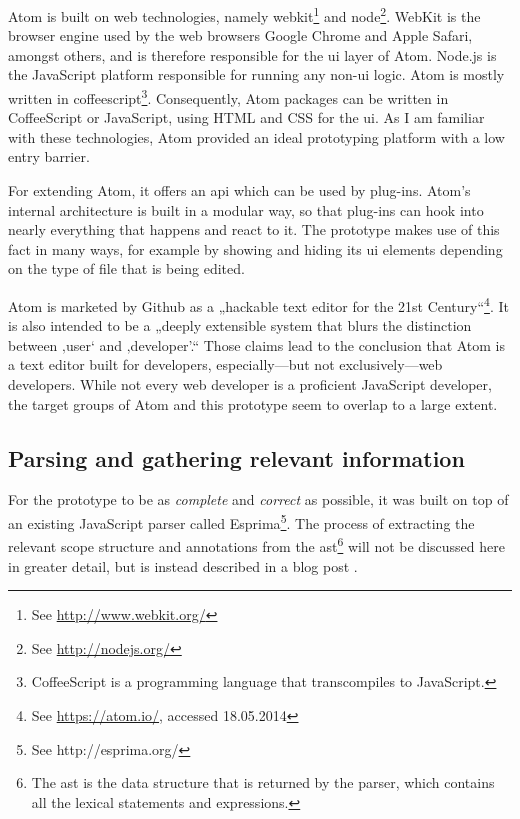 Atom is built on web technologies, namely
\gls{webkit}\footnote{See \url{http://www.webkit.org/}} and
\gls{node}\footnote{See \url{http://nodejs.org/}}. WebKit is the browser
engine used by the web browsers Google Chrome and Apple Safari, amongst
others, and is therefore responsible for the \acl{ui} layer of Atom.
Node.js is the JavaScript platform responsible for running any
non-\ac{ui} logic. Atom is mostly written in
\gls{coffeescript}\footnote{CoffeeScript is a programming language that transcompiles to JavaScript.}.
Consequently, Atom packages can be written in CoffeeScript or
JavaScript, using HTML and CSS for the \ac{ui}. As I am familiar with
these technologies, Atom provided an ideal prototyping platform with a
low entry barrier.

For extending Atom, it offers an \ac{api} which can be used by plug-ins.
Atom’s internal architecture is built in a modular way, so that plug-ins
can hook into nearly everything that happens and react to it. The
prototype makes use of this fact in many ways, for example by showing
and hiding its \ac{ui} elements depending on the type of file that is
being edited.

Atom is marketed by Github as a „hackable text editor for the 21st
Century“\footnote{See \url{https://atom.io/}, accessed 18.05.2014}. It
is also intended to be a „deeply extensible system that blurs the
distinction between ‚user‘ and ‚developer’.“ Those claims lead to the
conclusion that Atom is a text editor built for developers,
especially—but not exclusively—web developers. While not every web
developer is a proficient JavaScript developer, the target groups of
Atom and this prototype seem to overlap to a large extent.

\subsection{Parsing and gathering relevant
information}\label{parsing-and-gathering-relevant-information}

For the prototype to be as \emph{complete} and \emph{correct} as
possible, it was built on top of an existing JavaScript parser called
Esprima\footnote{See http://esprima.org/}. The process of extracting the
relevant scope structure and annotations from the
\ac{ast}\footnote{The \ac{ast} is the data structure that is returned by the parser, which contains all the lexical statements and expressions.}
will not be discussed here in greater detail, but is instead described
in a blog post \cite{tvo}.

